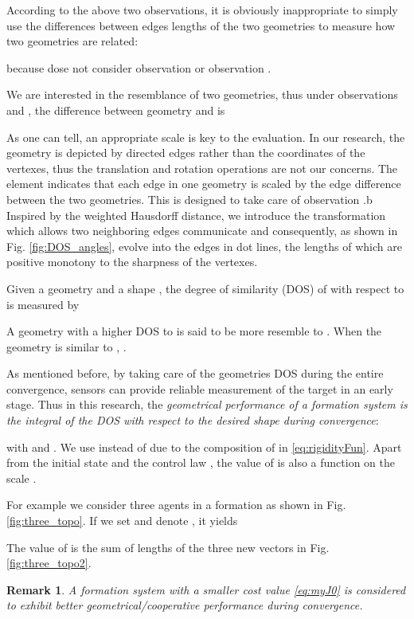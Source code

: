 \documentclass[times]{rncauth}
\newtheorem{rem}{Remark}[section]
\begin{document}
According to the above two observations, it is obviously inappropriate to simply use the differences between edges lengths of the two geometries to measure how two geometries are related:

because  dose not consider observation  or observation .

We are interested in the resemblance of two geometries, thus under observations  and , the difference between geometry  and  is

As one can tell, an appropriate scale  is key to the evaluation. In our research, the geometry is depicted by  directed edges
rather than the coordinates of the vertexes, thus the translation
and rotation operations are not our concerns.
 The element  indicates that
 each edge in one geometry is scaled by the edge difference between the two geometries.
 This is designed to take care of observation .b
Inspired by the weighted Hausdorff distance, we introduce the transformation  which allows two neighboring edges communicate and  consequently, as shown in Fig. \ref{fig:DOS_angles}, evolve into the edges in dot lines, the lengths of which are positive monotony to the sharpness of the vertexes.


Given a geometry    and a shape  , the degree of similarity (DOS) of  with respect to  is measured by

A geometry with a higher DOS to  is said to be more resemble to . When the geometry is similar to , .

As mentioned before, by taking care of the geometries DOS during the entire convergence, sensors can provide reliable measurement of the target in an early stage.  Thus in this research, the \emph{geometrical performance of a formation system is the integral of the DOS with respect to the desired shape during convergence}:

with  and . We use 
instead of  due to the composition of  in
\eqref{eq:rigidityFun}. Apart from the initial state 
and the control law , the value of  is also a function on the scale .


For example  we consider three agents in a formation as shown in Fig.
\ref{fig:three_topo}. If we set  and denote
, it yields

The value of  is the sum of  lengths of the three new vectors in Fig. \ref{fig:three_topo2}.

\begin{rem}
A formation system with a smaller cost value \eqref{eq:myJ0} is considered to
exhibit better geometrical/cooperative performance during convergence.
\end{rem}
\end{document}
